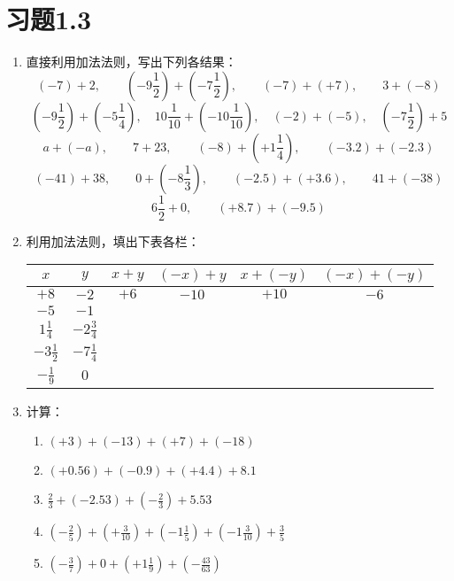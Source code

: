 \section*{习题1.3}

\begin{enumerate}
    \item 直接利用加法法则，写出下列各结果：
\[(-7)+2,\qquad \left(-9\frac{1}{2}\right)+\left(-7\frac{1}{2}\right),\qquad (-7)+(+7),\qquad 3+(-8)\]    
\[\left(-9\frac{1}{2}\right)+\left(-5\frac{1}{4}\right),\quad 10\frac{1}{10}+\left(-10\frac{1}{10}\right),\quad (-2)+(-5),\quad \left(-7\frac{1}{2}\right)+5 \]
\[a+(-a),\qquad 7+23,\qquad (-8)+\left(+1\frac{1}{4}\right),\qquad (-3.2)+(-2.3) \]
\[(-41)+38,\qquad 0+\left(-8\frac{1}{3}\right),\qquad (-2.5)+(+3.6),\qquad 41+(-38)\]
\[6\frac{1}{2}+0,\qquad (+8.7)+(-9.5) \]
    \item 利用加法法则，填出下表各栏：
\begin{center}
    \begin{tabular}{c|c|c|c|c|c}
\hline
$x$& $y$&  $x+y$& $(-x)+y$& $x+(-y)$& $(-x)+(-y)$\\ 
\hline
$+8$ &$-2$&$+6$&$-10$&$+10$&$-6$\\
$-5$ & $-1$ \\
$1\frac{1}{4}$ & $-2\frac{3}{4}$ \\
$-3\frac{1}{2}$ & $-7\frac{1}{4}$ \\
$-\frac{1}{9}$ & $0$ \\
\hline
    \end{tabular}
\end{center}

\item 计算：
\begin{enumerate}
    \item $(+3)+(-13)+(+7)+(-18)$
    \item $(+0.56)+(-0.9)+(+ 4.4)+8.1$
    \item $\frac{2}{3}+(-2.53)+\left(-\frac{2}{3}\right)+5.53$
    \item $\left(-\frac{2}{5}\right)+\left(+\frac{3}{10}\right)+\left(-1 \frac{1}{5}\right)+\left(-1 \frac{3}{10}\right)+\frac{3}{5}$
    \item $\left(-\frac{3}{7}\right)+0+\left(+1 \frac{1}{9}\right)+\left(-\frac{43}{63} \right)$
\end{enumerate}


\end{enumerate}
